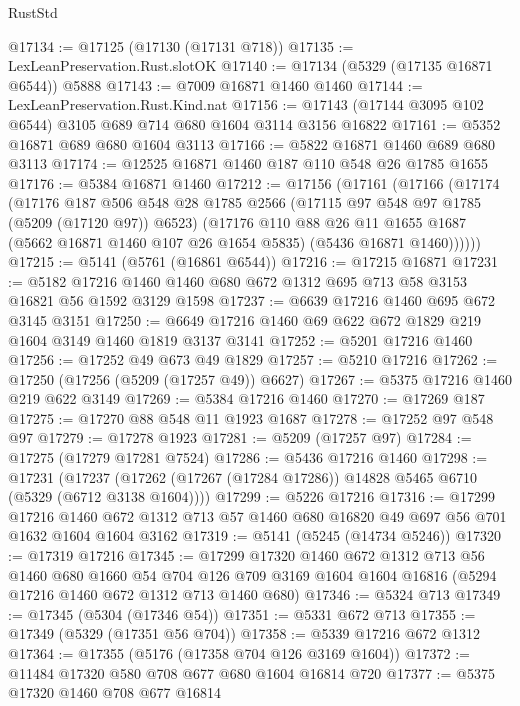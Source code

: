 \begin{lexlean}{RustStd}
\begin{coremodule}
@17134 := @17125 (@17130 (@17131 @718))
@17135 := LexLeanPreservation.Rust.slotOK
@17140 := @17134 (@5329 (@17135 @16871 @6544)) @5888
@17143 := @7009 @16871 @1460 @1460
@17144 := LexLeanPreservation.Rust.Kind.nat
@17156 := @17143 (@17144 @3095 @102 @6544) @3105 @689 @714 @680 @1604 @3114 @3156 @16822
@17161 := @5352 @16871 @689 @680 @1604 @3113
@17166 := @5822 @16871 @1460 @689 @680 @3113
@17174 := @12525 @16871 @1460 @187 @110 @548 @26 @1785 @1655
@17176 := @5384 @16871 @1460
@17212 := @17156
    (@17161
      (@17166
        (@17174
          (@17176
            @187
            @506
            @548
            @28
            @1785
            @2566
            (@17115 @97 @548 @97 @1785 (@5209 (@17120 @97)) @6523)
            (@17176
              @110
              @88
              @26
              @11
              @1655
              @1687
              (@5662 @16871 @1460 @107 @26 @1654 @5835)
              (@5436 @16871 @1460))))))
@17215 := @5141 (@5761 (@16861 @6544))
@17216 := @17215 @16871
@17231 := @5182 @17216 @1460 @1460 @680 @672 @1312 @695 @713 @58 @3153 @16821 @56 @1592 @3129 @1598
@17237 := @6639 @17216 @1460 @695 @672 @3145 @3151
@17250 := @6649 @17216 @1460 @69 @622 @672 @1829 @219 @1604 @3149 @1460 @1819 @3137 @3141
@17252 := @5201 @17216 @1460
@17256 := @17252 @49 @673 @49 @1829
@17257 := @5210 @17216
@17262 := @17250 (@17256 (@5209 (@17257 @49)) @6627)
@17267 := @5375 @17216 @1460 @219 @622 @3149
@17269 := @5384 @17216 @1460
@17270 := @17269 @187
@17275 := @17270 @88 @548 @11 @1923 @1687
@17278 := @17252 @97 @548 @97
@17279 := @17278 @1923
@17281 := @5209 (@17257 @97)
@17284 := @17275 (@17279 @17281 @7524)
@17286 := @5436 @17216 @1460
@17298 := @17231
    (@17237 (@17262 (@17267 (@17284 @17286)) @14828 @5465 @6710 (@5329 (@6712 @3138 @1604))))
@17299 := @5226 @17216
@17316 := @17299
    @17216
    @1460
    @672
    @1312
    @713
    @57
    @1460
    @680
    @16820
    @49
    @697
    @56
    @701
    @1632
    @1604
    @1604
    @3162
@17319 := @5141 (@5245 (@14734 @5246))
@17320 := @17319 @17216
@17345 := @17299
    @17320
    @1460
    @672
    @1312
    @713
    @56
    @1460
    @680
    @1660
    @54
    @704
    @126
    @709
    @3169
    @1604
    @1604
    @16816
    (@5294 @17216 @1460 @672 @1312 @713 @1460 @680)
@17346 := @5324 @713
@17349 := @17345 (@5304 (@17346 @54))
@17351 := @5331 @672 @713
@17355 := @17349 (@5329 (@17351 @56 @704))
@17358 := @5339 @17216 @672 @1312
@17364 := @17355 (@5176 (@17358 @704 @126 @3169 @1604))
@17372 := @11484 @17320 @580 @708 @677 @680 @1604 @16814 @720
@17377 := @5375 @17320 @1460 @708 @677 @16814

\end{coremodule}
\end{lexlean}
